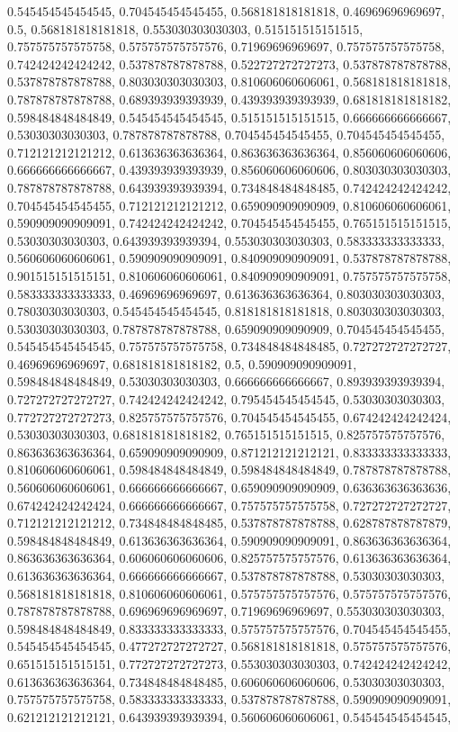 \documentclass[
  man,floatsintext]{apa6}
\begin{document}
0.545454545454545, 0.704545454545455, 0.568181818181818, 0.46969696969697, 0.5, 0.568181818181818, 0.553030303030303, 0.515151515151515, 0.757575757575758, 0.575757575757576, 0.71969696969697, 0.757575757575758, 0.742424242424242, 0.537878787878788, 0.522727272727273, 0.537878787878788, 0.537878787878788, 0.803030303030303, 0.810606060606061, 0.568181818181818, 0.787878787878788, 0.689393939393939, 0.439393939393939, 0.681818181818182, 0.598484848484849, 0.545454545454545, 0.515151515151515, 0.666666666666667,
0.53030303030303, 0.787878787878788, 0.704545454545455, 0.704545454545455, 0.712121212121212, 0.613636363636364, 0.863636363636364, 0.856060606060606, 0.666666666666667, 0.439393939393939, 0.856060606060606, 0.803030303030303, 0.787878787878788, 0.643939393939394, 0.734848484848485, 0.742424242424242, 0.704545454545455, 0.712121212121212, 0.659090909090909, 0.810606060606061, 0.590909090909091, 0.742424242424242, 0.704545454545455, 0.765151515151515, 0.53030303030303, 0.643939393939394, 0.553030303030303,
0.583333333333333, 0.560606060606061, 0.590909090909091, 0.840909090909091, 0.537878787878788, 0.901515151515151, 0.810606060606061, 0.840909090909091, 0.757575757575758, 0.583333333333333, 0.46969696969697, 0.613636363636364, 0.803030303030303, 0.78030303030303, 0.545454545454545, 0.818181818181818, 0.803030303030303, 0.53030303030303, 0.787878787878788, 0.659090909090909, 0.704545454545455, 0.545454545454545, 0.757575757575758, 0.734848484848485, 0.727272727272727, 0.46969696969697, 0.681818181818182,
0.5, 0.590909090909091, 0.598484848484849, 0.53030303030303, 0.666666666666667, 0.893939393939394, 0.727272727272727, 0.742424242424242, 0.795454545454545, 0.53030303030303, 0.772727272727273, 0.825757575757576, 0.704545454545455, 0.674242424242424, 0.53030303030303, 0.681818181818182, 0.765151515151515, 0.825757575757576, 0.863636363636364, 0.659090909090909, 0.871212121212121, 0.833333333333333, 0.810606060606061, 0.598484848484849, 0.598484848484849, 0.787878787878788, 0.560606060606061, 0.666666666666667,
0.659090909090909, 0.636363636363636, 0.674242424242424, 0.666666666666667, 0.757575757575758, 0.727272727272727, 0.712121212121212, 0.734848484848485, 0.537878787878788, 0.628787878787879, 0.598484848484849, 0.613636363636364, 0.590909090909091, 0.863636363636364, 0.863636363636364, 0.606060606060606, 0.825757575757576, 0.613636363636364, 0.613636363636364, 0.666666666666667, 0.537878787878788, 0.53030303030303, 0.568181818181818, 0.810606060606061, 0.575757575757576, 0.575757575757576, 0.787878787878788,
0.696969696969697, 0.71969696969697, 0.553030303030303, 0.598484848484849, 0.833333333333333, 0.575757575757576, 0.704545454545455, 0.545454545454545, 0.477272727272727, 0.568181818181818, 0.575757575757576, 0.651515151515151, 0.772727272727273, 0.553030303030303, 0.742424242424242, 0.613636363636364, 0.734848484848485, 0.606060606060606, 0.53030303030303, 0.757575757575758, 0.583333333333333, 0.537878787878788, 0.590909090909091, 0.621212121212121, 0.643939393939394, 0.560606060606061, 0.545454545454545,
\end{document}
